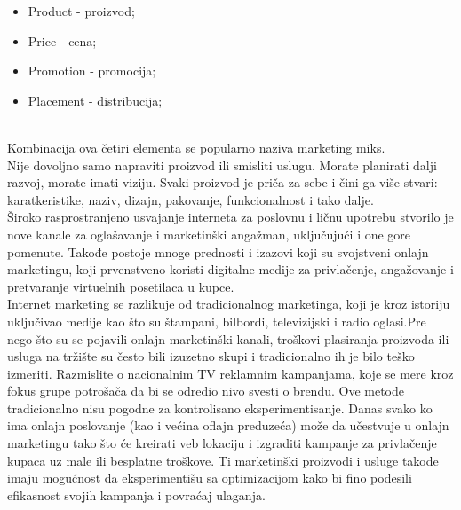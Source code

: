 \documentclass[a4paper]{article}
\begin{document}
{\begin{itemize}
    \item Product - proizvod;
    \item Price - cena;
    \item Promotion - promocija;
    \item Placement - distribucija;
    \label{item:uvod}
\end{itemize}
\\ Kombinacija ova četiri elementa se popularno naziva marketing miks.
\\ Nije dovoljno samo napraviti proizvod ili smisliti uslugu. Morate planirati dalji razvoj, morate imati viziju. Svaki proizvod je priča za sebe i čini ga više stvari: karatkeristike, naziv, dizajn, pakovanje, funkcionalnost i tako dalje.
\newpage
\\ Široko rasprostranjeno usvajanje interneta za poslovnu i ličnu upotrebu stvorilo je nove kanale za oglašavanje i marketinški angažman, uključujući i one gore pomenute. Takođe postoje mnoge prednosti i izazovi koji su svojstveni onlajn marketingu, koji prvenstveno koristi digitalne medije za privlačenje, angažovanje i pretvaranje virtuelnih posetilaca u kupce.
\\Internet marketing se razlikuje od tradicionalnog marketinga, koji je kroz istoriju uključivao medije kao što su štampani, bilbordi, televizijski i radio oglasi.Pre nego što su se pojavili onlajn marketinški kanali, troškovi plasiranja proizvoda ili usluga na tržište su često bili izuzetno skupi i tradicionalno ih je bilo teško izmeriti. Razmislite o nacionalnim TV reklamnim kampanjama, koje se mere kroz fokus grupe potrošača da bi se odredio nivo svesti o brendu. Ove metode tradicionalno nisu pogodne za kontrolisano eksperimentisanje. Danas svako ko ima onlajn poslovanje (kao i većina oflajn preduzeća) može da učestvuje u onlajn marketingu tako što će kreirati veb lokaciju i izgraditi kampanje za privlačenje kupaca uz male ili besplatne troškove. Ti marketinški proizvodi i usluge takođe imaju mogućnost da eksperimentišu sa optimizacijom kako bi fino podesili efikasnost svojih kampanja i povraćaj ulaganja.

}
\end{document}
